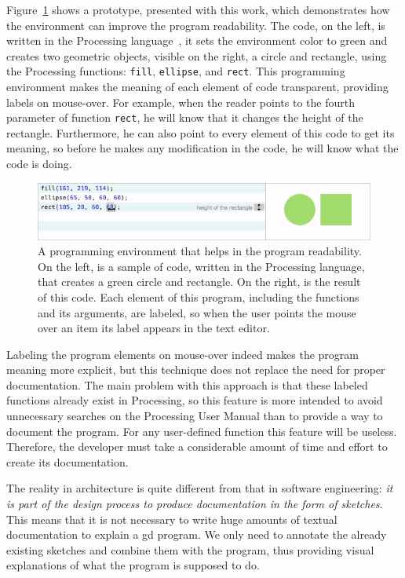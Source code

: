Figure~\ref{fig:victor-ex} shows a prototype, presented with this work, which demonstrates how the environment can improve the program readability. The code, on the left, is written in the Processing language~\citep{Reas2006}, it sets the environment color to green and creates two geometric objects, visible on the right, a circle and rectangle, using the Processing functions: \texttt{fill}, \texttt{ellipse}, and \texttt{rect}. This programming environment makes the meaning of each element of code transparent, providing labels on mouse-over. For example, when the reader points to the fourth parameter of function \texttt{rect}, he will know that it changes the height of the rectangle. Furthermore, he can also point to every element of this code to get its meaning, so before he makes any modification in the code, he will know what the code is doing.     

\begin{figure}[!h]
  \centering
  \includegraphics[width=.7\textwidth]{images/victor-example}
    \caption{A programming environment that helps in the program readability. On the left, is a sample of code, written in the Processing language, that creates a green circle and rectangle. On the right, is the result of this code. Each element of this program, including the functions and its arguments, are labeled, so when the user points the mouse over an item its label appears in the text editor.}
  \label{fig:victor-ex}
\end{figure}

Labeling the program elements on mouse-over indeed makes the program meaning more explicit, but this technique does not replace the need for proper documentation. The main problem with this approach is that these labeled functions already exist in Processing, so this feature is more intended to avoid unnecessary searches on the Processing User Manual than to provide a way to document the program. For any user-defined function this feature will be useless. Therefore, the developer must take a considerable amount of time and effort to create its documentation.

The reality in architecture is quite different from that in software engineering: \textit{it is part of the design process to produce documentation in the form of sketches}. This means that it is not necessary to write huge amounts of textual documentation to explain a \gls{gd} program. We only need to annotate the already existing sketches and combine them with the program, thus providing visual explanations of what the program is supposed to do.

